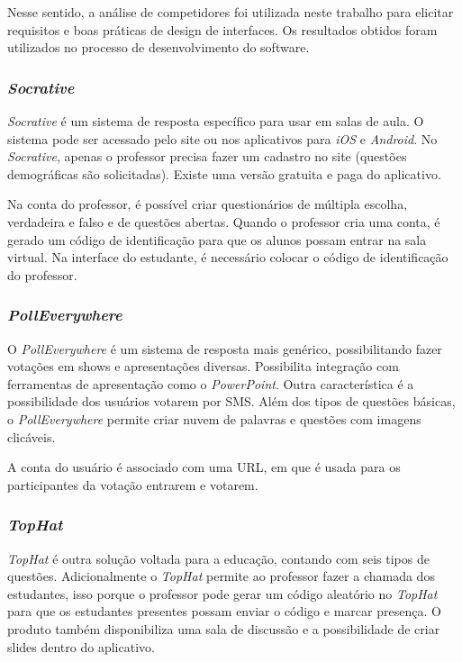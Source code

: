 Nesse sentido, a análise de competidores foi utilizada neste trabalho para elicitar requisitos e boas práticas
de design de interfaces. %
Os resultados obtidos foram utilizados no processo de desenvolvimento do software.

\subsubsection{\textit{Socrative}}

\textit{Socrative} é um sistema de resposta específico para usar em salas de aula. O sistema pode ser
acessado pelo site ou nos aplicativos para \textit{iOS} e \textit{Android}. No \textit{Socrative}, apenas o professor
precisa fazer um cadastro no site (questões demográficas são solicitadas). Existe uma versão
gratuita e paga do aplicativo.

Na conta do professor, é possível criar questionários de múltipla escolha, verdadeira e falso e
de questões abertas. Quando o professor cria uma conta, é gerado um código de identificação
para que os alunos possam entrar na sala virtual. Na interface do estudante, é necessário
colocar o código de identificação do professor.

\subsubsection{\textit{PollEverywhere}}

O \textit{PollEverywhere} é um sistema de resposta mais genérico, possibilitando fazer votações em
shows e apresentações diversas. Possibilita integração com ferramentas de apresentação
como o \textit{PowerPoint}. Outra característica é a possibilidade dos usuários votarem por SMS.
Além dos tipos de questões básicas, o \textit{PollEverywhere} permite criar nuvem de palavras e
questões com imagens clicáveis.

A conta do usuário é associado com uma URL, em que é usada para os participantes
da votação entrarem e votarem.

\subsubsection{\textit{TopHat}}

\textit{TopHat} é outra solução voltada para a educação, contando com seis tipos de questões.
Adicionalmente o \textit{TopHat} permite ao professor fazer a chamada dos estudantes, isso porque
o professor pode gerar um código aleatório no \textit{TopHat} para que os estudantes presentes
possam enviar o código e marcar presença. O produto também disponibiliza uma sala
de discussão e a possibilidade de criar slides dentro do aplicativo.

